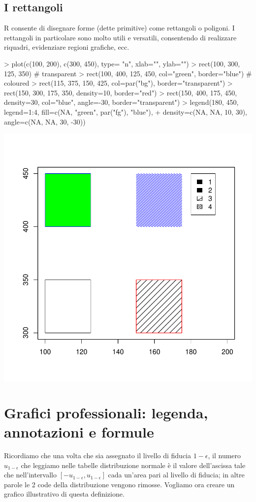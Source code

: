 \documentclass[onecolumn,11pt]{book}
\begin{document}
\subsection{I rettangoli }
\textsf{R} consente di disegnare forme (dette primitive) come rettangoli o poligoni. I rettangoli in particolare sono molto utili e versatili, consentendo di realizzare riquadri, evidenziare regioni grafiche, ecc.
\begin{Schunk}
\begin{Sinput}
> plot(c(100, 200), c(300, 450), type= "n", xlab="", ylab="")
> rect(100, 300, 125, 350) # transparent
> rect(100, 400, 125, 450, col="green", border="blue") # coloured
> rect(115, 375, 150, 425, col=par("bg"), border="transparent")
> rect(150, 300, 175, 350, density=10, border="red")
> rect(150, 400, 175, 450, density=30, col="blue", angle=-30, border="transparent")
> legend(180, 450, legend=1:4, fill=c(NA, "green", par("fg"), "blue"),
+ density=c(NA, NA, 10, 30), angle=c(NA, NA, 30, -30))
\end{Sinput}
\end{Schunk}
\includegraphics{statisticaconR-356}

\section{Grafici professionali: legenda, annotazioni e formule}
Ricordiamo che una volta che sia  assegnato il livello di fiducia $1-\epsilon$, il numero $u_{1-\epsilon}$ che leggiamo nelle tabelle  distribuzione normale \`e il valore dell'ascissa tale che nell'intervallo $[-u_{1-\epsilon},u_{1-\epsilon}]$  cada un'area pari al livello di fiducia; in altre parole le 2 code della distribuzione vengono rimosse. 
Vogliamo ora creare un grafico illustrativo di questa definizione.
\end{document}
